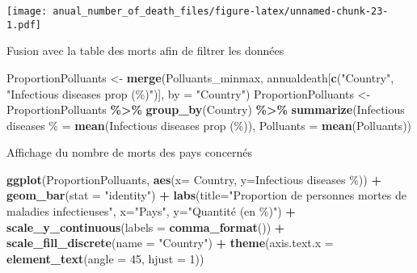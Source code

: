 \documentclass[
]{article}
\newenvironment{Shaded}{\begin{snugshade}}{\end{snugshade}}
\newcommand{\AttributeTok}[1]{\textcolor[rgb]{0.13,0.29,0.53}{#1}}
\newcommand{\DecValTok}[1]{\textcolor[rgb]{0.00,0.00,0.81}{#1}}
\newcommand{\FunctionTok}[1]{\textcolor[rgb]{0.13,0.29,0.53}{\textbf{#1}}}
\newcommand{\NormalTok}[1]{#1}
\newcommand{\OtherTok}[1]{\textcolor[rgb]{0.56,0.35,0.01}{#1}}
\newcommand{\SpecialCharTok}[1]{\textcolor[rgb]{0.81,0.36,0.00}{\textbf{#1}}}
\newcommand{\StringTok}[1]{\textcolor[rgb]{0.31,0.60,0.02}{#1}}
\begin{document}
\texttt{[image: anual\_number\_of\_death\_files/figure-latex/unnamed-chunk-23-1.pdf]}

Fusion avec la table des morts afin de filtrer les données

\begin{Shaded}
\begin{Highlighting}[]
\NormalTok{ProportionPolluants }\OtherTok{\textless{}{-}} \FunctionTok{merge}\NormalTok{(Polluants\_minmax, annualdeath[}\FunctionTok{c}\NormalTok{(}\StringTok{"Country"}\NormalTok{, }\StringTok{"Infectious diseases prop (\%)"}\NormalTok{)], }\AttributeTok{by =} \StringTok{"Country"}\NormalTok{)}
\NormalTok{ProportionPolluants }\OtherTok{\textless{}{-}}\NormalTok{ ProportionPolluants }\SpecialCharTok{\%\textgreater{}\%} \FunctionTok{group\_by}\NormalTok{(Country) }\SpecialCharTok{\%\textgreater{}\%} \FunctionTok{summarize}\NormalTok{(}\StringTok{\textasciigrave{}}\AttributeTok{Infectious diseases \%}\StringTok{\textasciigrave{}} \OtherTok{=} \FunctionTok{mean}\NormalTok{(}\StringTok{\textasciigrave{}}\AttributeTok{Infectious diseases prop (\%)}\StringTok{\textasciigrave{}}\NormalTok{), }\StringTok{\textasciigrave{}}\AttributeTok{Polluants}\StringTok{\textasciigrave{}} \OtherTok{=} \FunctionTok{mean}\NormalTok{(}\StringTok{\textasciigrave{}}\AttributeTok{Polluants}\StringTok{\textasciigrave{}}\NormalTok{))}
\end{Highlighting}
\end{Shaded}

Affichage du nombre de morts des pays concernés

\begin{Shaded}
\begin{Highlighting}[]
\FunctionTok{ggplot}\NormalTok{(ProportionPolluants, }\FunctionTok{aes}\NormalTok{(}\AttributeTok{x=}\NormalTok{ Country, }\AttributeTok{y=}\StringTok{\textasciigrave{}}\AttributeTok{Infectious diseases \%}\StringTok{\textasciigrave{}}\NormalTok{)) }\SpecialCharTok{+} \FunctionTok{geom\_bar}\NormalTok{(}\AttributeTok{stat =} \StringTok{"identity"}\NormalTok{) }\SpecialCharTok{+} \FunctionTok{labs}\NormalTok{(}\AttributeTok{title=}\StringTok{"Proportion de personnes mortes de maladies infectieuses"}\NormalTok{, }\AttributeTok{x=}\StringTok{"Pays"}\NormalTok{, }\AttributeTok{y=}\StringTok{"Quantité (en \%)"}\NormalTok{) }\SpecialCharTok{+} \FunctionTok{scale\_y\_continuous}\NormalTok{(}\AttributeTok{labels =} \FunctionTok{comma\_format}\NormalTok{()) }\SpecialCharTok{+} \FunctionTok{scale\_fill\_discrete}\NormalTok{(}\AttributeTok{name =} \StringTok{"Country"}\NormalTok{) }\SpecialCharTok{+} 
  \FunctionTok{theme}\NormalTok{(}\AttributeTok{axis.text.x =} \FunctionTok{element\_text}\NormalTok{(}\AttributeTok{angle =} \DecValTok{45}\NormalTok{, }\AttributeTok{hjust =} \DecValTok{1}\NormalTok{))}
\end{Highlighting}
\end{Shaded}
\end{document}
